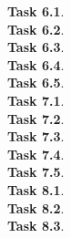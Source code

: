 \documentclass[11pt]{article}
\newcommand{\task}[1]{\clearpage\textbf{Task #1}. \\[0.5em]}
\begin{document}
\task{6.1}

\task{6.2}

\task{6.3}

\task{6.4}

\task{6.5}

\task{7.1}

\task{7.2}

\task{7.3}

\task{7.4}

\task{7.5}

\task{8.1}

\task{8.2}

\task{8.3}
\end{document}
